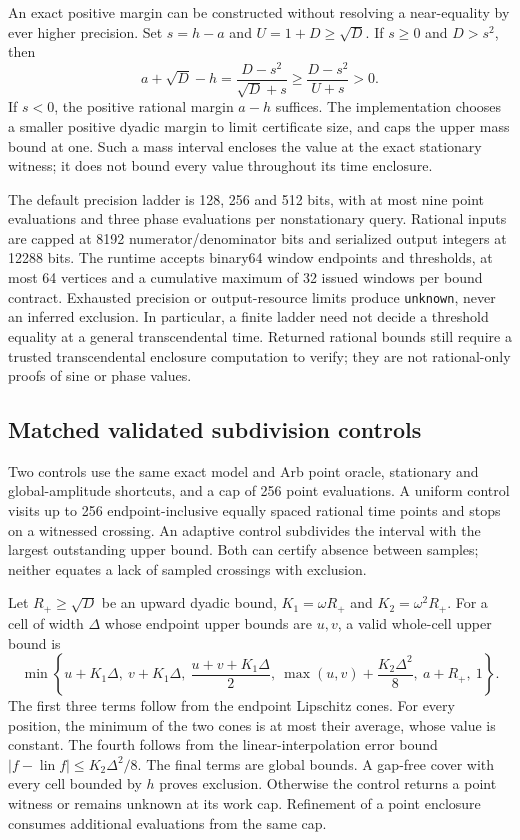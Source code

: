 \documentclass[11pt,a4paper]{article}
\theoremstyle{definition}\newtheorem{definition}[theorem]{Definition}
\begin{document}
An exact positive margin can be constructed without resolving a near-equality by ever higher precision. Set $s=h-a$ and $U=1+D\geq\sqrt D$. If $s\geq0$ and $D>s^2$, then
\begin{equation}\label{eq:windowmargin}
 a+\sqrt D-h=\frac{D-s^2}{\sqrt D+s}
 \geq\frac{D-s^2}{U+s}>0.
\end{equation}
If $s<0$, the positive rational margin $a-h$ suffices. The implementation chooses a smaller positive dyadic margin to limit certificate size, and caps the upper mass bound at one. Such a mass interval encloses the value at the exact stationary witness; it does not bound every value throughout its time enclosure.

The default precision ladder is 128, 256 and 512 bits, with at most nine point evaluations and three phase evaluations per nonstationary query. Rational inputs are capped at 8192 numerator/denominator bits and serialized output integers at 12288 bits. The runtime accepts binary64 window endpoints and thresholds, at most 64 vertices and a cumulative maximum of 32 issued windows per bound contract. Exhausted precision or output-resource limits produce \texttt{unknown}, never an inferred exclusion. In particular, a finite ladder need not decide a threshold equality at a general transcendental time. Returned rational bounds still require a trusted transcendental enclosure computation to verify; they are not rational-only proofs of sine or phase values.

\subsection{Matched validated subdivision controls}\label{sec:windowbaselines}
Two controls use the same exact model and Arb point oracle, stationary and global-amplitude shortcuts, and a cap of 256 point evaluations. A uniform control visits up to 256 endpoint-inclusive equally spaced rational time points and stops on a witnessed crossing. An adaptive control subdivides the interval with the largest outstanding upper bound. Both can certify absence between samples; neither equates a lack of sampled crossings with exclusion.

Let $R_+\geq\sqrt D$ be an upward dyadic bound, $K_1=\omega R_+$ and $K_2=\omega^2R_+$. For a cell of width $\Delta$ whose endpoint upper bounds are $u,v$, a valid whole-cell upper bound is
\begin{equation}\label{eq:windowcellbound}
 \min\left\{u+K_1\Delta,\ v+K_1\Delta,\
 \frac{u+v+K_1\Delta}{2},\
 \max(u,v)+\frac{K_2\Delta^2}{8},\ a+R_+,\ 1\right\}.
\end{equation}
The first three terms follow from the endpoint Lipschitz cones. For every position, the minimum of the two cones is at most their average, whose value is constant. The fourth follows from the linear-interpolation error bound $|f-\operatorname{lin}f|\leq K_2\Delta^2/8$. The final terms are global bounds. A gap-free cover with every cell bounded by $h$ proves exclusion. Otherwise the control returns a point witness or remains unknown at its work cap. Refinement of a point enclosure consumes additional evaluations from the same cap.
\end{document}
